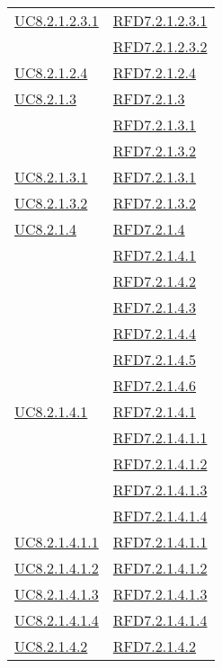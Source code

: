 \begin{longtable}{|>{\centering}m{5cm}|m{5cm}<{\centering}|}
\hyperref[UC8.2.1.2.3.1]{UC8.2.1.2.3.1} & \hyperlink{RFD7.2.1.2.3.1}{RFD7.2.1.2.3.1}\\
& \hyperlink{RFD7.2.1.2.3.2}{RFD7.2.1.2.3.2}\\ \hline
\hyperref[UC8.2.1.2.4]{UC8.2.1.2.4} & \hyperlink{RFD7.2.1.2.4}{RFD7.2.1.2.4}\\ \hline
\hyperref[UC8.2.1.3]{UC8.2.1.3} & \hyperlink{RFD7.2.1.3}{RFD7.2.1.3}\\
& \hyperlink{RFD7.2.1.3.1}{RFD7.2.1.3.1}\\
& \hyperlink{RFD7.2.1.3.2}{RFD7.2.1.3.2}\\ \hline
\hyperref[UC8.2.1.3.1]{UC8.2.1.3.1} & \hyperlink{RFD7.2.1.3.1}{RFD7.2.1.3.1}\\ \hline
\hyperref[UC8.2.1.3.2]{UC8.2.1.3.2} & \hyperlink{RFD7.2.1.3.2}{RFD7.2.1.3.2}\\ \hline
\hyperref[UC8.2.1.4]{UC8.2.1.4} & \hyperlink{RFD7.2.1.4}{RFD7.2.1.4}\\
& \hyperlink{RFD7.2.1.4.1}{RFD7.2.1.4.1}\\
& \hyperlink{RFD7.2.1.4.2}{RFD7.2.1.4.2}\\
& \hyperlink{RFD7.2.1.4.3}{RFD7.2.1.4.3}\\
& \hyperlink{RFD7.2.1.4.4}{RFD7.2.1.4.4}\\
& \hyperlink{RFD7.2.1.4.5}{RFD7.2.1.4.5}\\
& \hyperlink{RFD7.2.1.4.6}{RFD7.2.1.4.6}\\ \hline
\hyperref[UC8.2.1.4.1]{UC8.2.1.4.1} & \hyperlink{RFD7.2.1.4.1}{RFD7.2.1.4.1}\\
& \hyperlink{RFD7.2.1.4.1.1}{RFD7.2.1.4.1.1}\\
& \hyperlink{RFD7.2.1.4.1.2}{RFD7.2.1.4.1.2}\\
& \hyperlink{RFD7.2.1.4.1.3}{RFD7.2.1.4.1.3}\\
& \hyperlink{RFD7.2.1.4.1.4}{RFD7.2.1.4.1.4}\\ \hline
\hyperref[UC8.2.1.4.1.1]{UC8.2.1.4.1.1} & \hyperlink{RFD7.2.1.4.1.1}{RFD7.2.1.4.1.1}\\ \hline
\hyperref[UC8.2.1.4.1.2]{UC8.2.1.4.1.2} & \hyperlink{RFD7.2.1.4.1.2}{RFD7.2.1.4.1.2}\\ \hline
\hyperref[UC8.2.1.4.1.3]{UC8.2.1.4.1.3} & \hyperlink{RFD7.2.1.4.1.3}{RFD7.2.1.4.1.3}\\ \hline
\hyperref[UC8.2.1.4.1.4]{UC8.2.1.4.1.4} & \hyperlink{RFD7.2.1.4.1.4}{RFD7.2.1.4.1.4}\\ \hline
\hyperref[UC8.2.1.4.2]{UC8.2.1.4.2} & \hyperlink{RFD7.2.1.4.2}{RFD7.2.1.4.2}\\

\end{longtable}
